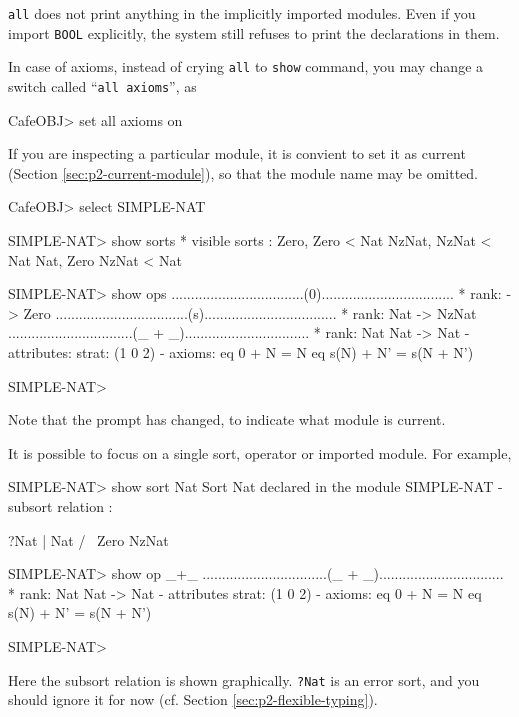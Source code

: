 \documentclass[a4paper]{memoir}
\begin{document}
\begin{warning}
  \verb|all| does not print anything in the implicitly imported modules.
  Even if you import \verb|BOOL| explicitly, the system still refuses to
  print the declarations in them.
\end{warning}

In case of axioms, instead of crying \verb|all| to \verb|show| command,
you may change a switch called ``\verb|all axioms|'', as
\begin{vvtm}
\begin{ccode}
  CafeOBJ> set all axioms on
\end{ccode}
\end{vvtm}

If you are inspecting a particular module, it is convient to set
it as current (Section \ref{sec:p2-current-module}), so that the
module name may be omitted.
\begin{vvtm}
\begin{ccode}
  CafeOBJ> select SIMPLE-NAT

  SIMPLE-NAT> show sorts
  * visible sorts :
    Zero, Zero < Nat
    NzNat, NzNat < Nat
    Nat, Zero NzNat < Nat

  SIMPLE-NAT> show ops
  ..................................(0)..................................
    * rank: -> Zero
  ..................................(s)..................................
    * rank: Nat -> NzNat
  ................................(_ + _)................................
    * rank: Nat Nat -> Nat
      - attributes:  { strat: (1 0 2) }
      - axioms:
        eq 0 + N = N
        eq s(N) + N' = s(N + N')

  SIMPLE-NAT>
\end{ccode}
\end{vvtm}
Note that the prompt has changed, to indicate what module is current.

It is possible to focus on a single sort, operator or imported module.
For example,
\begin{vvtm}
\begin{ccode}
  SIMPLE-NAT> show sort Nat
  Sort Nat declared in the module SIMPLE-NAT
    - subsort relation :
  
       ?Nat    
         |      
        Nat    
      /     \   
    Zero  NzNat
              
  

  SIMPLE-NAT> show op _+_
  ................................(_ + _)................................
    * rank: Nat Nat -> Nat
      - attributes { strat: (1 0 2) }
      - axioms:
        eq 0 + N = N
        eq s(N) + N' = s(N + N')

  SIMPLE-NAT>
\end{ccode}
\end{vvtm}
Here the subsort relation is shown graphically. \verb|?Nat| is
an error sort, and you should ignore it for now (cf. Section
\ref{sec:p2-flexible-typing}).
\end{document}
